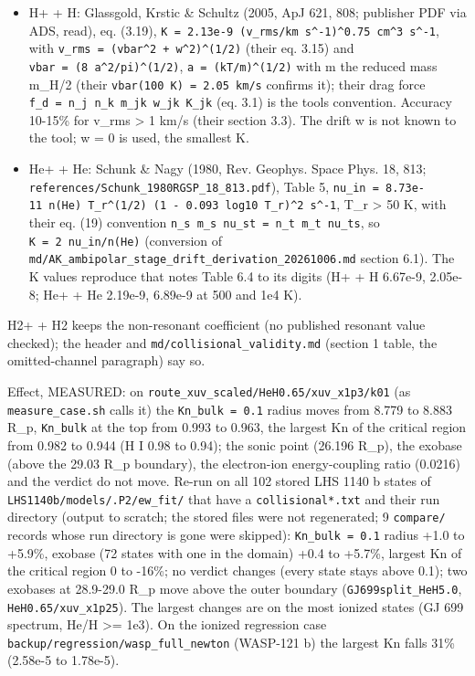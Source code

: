 \documentclass[english,a4paper]{my_memo}
\providecommand{\tightlist}{\setlength{\itemsep}{0pt}\setlength{\parskip}{0pt}}
\begin{document}
\begin{itemize}
\tightlist
\item
  H+ + H: Glassgold, Krstic \& Schultz (2005, ApJ 621, 808; publisher PDF via
  ADS, read), eq. (3.19), \texttt{K\ =\ 2.13e-9\ (v\_rms/km\ s\^{}-1)\^{}0.75\ cm\^{}3\ s\^{}-1}, with
  \texttt{v\_rms\ =\ (vbar\^{}2\ +\ w\^{}2)\^{}(1/2)} (their eq. 3.15) and \texttt{vbar\ =\ (8\ a\^{}2/pi)\^{}(1/2)},
  \texttt{a\ =\ (kT/m)\^{}(1/2)} with m the reduced mass m\_H/2 (their \texttt{vbar(100\ K)\ =\ 2.05\ km/s} confirms it); their drag force \texttt{f\_d\ =\ n\_j\ n\_k\ m\_jk\ w\_jk\ K\_jk}
  (eq. 3.1) is the tool\textquotesingle s convention. Accuracy 10-15\% for v\_rms \textgreater{} 1 km/s
  (their section 3.3). The drift w is not known to the tool; w = 0 is used,
  the smallest K.
\item
  He+ + He: Schunk \& Nagy (1980, Rev. Geophys. Space Phys. 18, 813;
  \texttt{references/Schunk\_1980RGSP\_18\_813.pdf}), Table 5, \texttt{nu\_in\ =\ 8.73e-11\ n(He)\ T\_r\^{}(1/2)\ (1\ -\ 0.093\ log10\ T\_r)\^{}2\ s\^{}-1}, T\_r \textgreater{} 50 K, with their eq. (19)
  convention \texttt{n\_s\ m\_s\ nu\_st\ =\ n\_t\ m\_t\ nu\_ts}, so \texttt{K\ =\ 2\ nu\_in/n(He)}
  (conversion of \texttt{md/AK\_ambipolar\_stage\_drift\_derivation\_20261006.md}
  section 6.1). The K values reproduce that note\textquotesingle s Table 6.4 to its digits
  (H+ + H 6.67e-9, 2.05e-8; He+ + He 2.19e-9, 6.89e-9 at 500 and 1e4 K).
\end{itemize}

H2+ + H2 keeps the non-resonant coefficient (no published resonant value
checked); the header and \texttt{md/collisional\_validity.md} (section 1 table, the
omitted-channel paragraph) say so.

Effect, MEASURED: on \texttt{route\_xuv\_scaled/HeH0.65/xuv\_x1p3/k01} (as
\texttt{measure\_case.sh} calls it) the \texttt{Kn\_bulk\ =\ 0.1} radius moves from 8.779 to
8.883 R\_p, \texttt{Kn\_bulk} at the top from 0.993 to 0.963, the largest Kn of the
critical region from 0.982 to 0.944 (H I 0.98 to 0.94); the sonic point
(26.196 R\_p), the exobase (above the 29.03 R\_p boundary), the electron-ion
energy-coupling ratio (0.0216) and the verdict do not move. Re-run on all
102 stored LHS 1140 b states of \texttt{LHS1140b/models/.P2/ew\_fit/} that have a
\texttt{collisional*.txt} and their run directory (output to scratch; the stored
files were not regenerated; 9 \texttt{compare/} records whose run directory is
gone were skipped): \texttt{Kn\_bulk\ =\ 0.1} radius +1.0 to +5.9\%, exobase (72 states
with one in the domain) +0.4 to +5.7\%, largest Kn of the critical region 0
to -16\%; no verdict changes (every state stays above 0.1); two exobases at
28.9-29.0 R\_p move above the outer boundary (\texttt{GJ699split\_HeH5.0},
\texttt{HeH0.65/xuv\_x1p25}). The largest changes are on the most ionized states
(GJ 699 spectrum, He/H \textgreater= 1e3). On the ionized regression case
\texttt{backup/regression/wasp\_full\_newton} (WASP-121 b) the largest Kn falls 31\%
(2.58e-5 to 1.78e-5).
\end{document}

